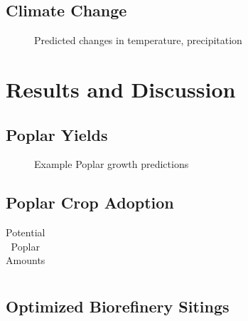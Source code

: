 \documentclass[preprint,12pt]{elsarticle}
\begin{document}
{%

\subsection{Climate Change}
\label{sec:climate}

\begin{figure}[hp]
  \centering
  
  \caption{Predicted changes in temperature, precipitation }
  \label{fig:temp}
\end{figure}

\section{Results and Discussion}

\subsection{Poplar Yields}
\label{sec:yield}

\begin{figure}[hp]
  \centering
  
  \caption{Example Poplar growth predictions}
  \label{fig:examples}
\end{figure}



\subsection{Poplar Crop Adoption}
\label{sec:bcam-out}

\begin{table}[hp]
  \centering
  \begin{tabular}{|l|c|c|}
    
  \end{tabular}
  \caption{Potential Poplar Amounts}
  \label{tab:potential}
\end{table}

\subsection{Optimized Biorefinery Sitings}
\label{sec:gbsm-out}

}
\end{document}
